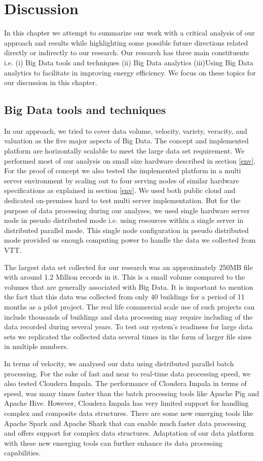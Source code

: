 \chapter{Discussion}
\label{chapter:discussion}
In this chapter we attempt to summarize our work with a critical analysis of our approach and results while highlighting some possible future directions related directly or indirectly to our research. Our research has three main constituents i.e. (i) Big Data tools and techniques (ii) Big Data analytics (iii)Using Big Data analytics to facilitate in improving energy efficiency. We focus on these topics for our discussion in this chapter.    

\section{Big Data tools and techniques}
In our approach, we tried to cover data volume, velocity, variety, veracity, and valuation as the five major aspects of Big Data. The concept and implemented platform are horizontally scalable to meet the large data set requirement. We performed most of our analysis on small size hardware described in section \ref{env}. For the proof of concept we also tested the implemented platform in a multi server environment by scaling out to four serving nodes of similar hardware specifications as explained in section \ref{env}. We used both public cloud and dedicated on-premises hard to test multi server implementation. But for the purpose of data processing during our analyses, we used single hardware server node in pseudo distributed mode i.e. using resources within a single server in distributed parallel mode. This single node configuration in pseudo distributed mode provided us enough computing power to handle the data we collected from VTT. 

The largest data set collected for our research was an approximately 250MB file with around 1.2 Million records in it. This is a small volume compared to the volumes that are generally associated with Big Data. It is important to mention the fact that this data was collected from only 40 buildings for a period of 11 months as a pilot project. The real life commercial scale use of such projects can include thousands of buildings and data processing may require including of the data recorded  during several years. To test our system's readiness for large data sets we replicated the collected data several times in the form of larger file sizes in multiple numbers. 

In terms of velocity, we analysed our data using distributed parallel batch processing. For the sake of fast and near to real-time data processing speed, we also tested Cloudera Impala. The performance of Cloudera Impala in terms of speed, was many times faster than the batch processing tools like Apache Pig and Apache Hive.  However, Cloudera Impala has very limited support for handling complex and composite data structures. There are some new emerging tools like Apache Spark and Apache Shark that can enable much faster data processing and offers support for complex data structures. Adaptation of our data platform with these new emerging tools can further enhance its data processing capabilities. 

